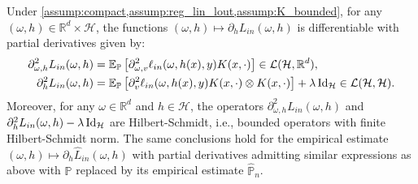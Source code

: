\begin{proposition}\label{prop:fre_diff_L_v}
	Under \cref{assump:compact,assump:reg_lin_lout,assump:K_bounded}, for any $(\omega,h)\in{\mathbb{R}^d}\times \mathcal{H}$, the functions $(\omega,h)\mapsto \partial_{h} L_{in}(\omega,h)$ is differentiable with partial derivatives given by: 
\begin{align*}
    \partial_{\omega, h}^2 L_{in}(\omega, h)&=\mathbb{E}_{\mathbb{P}}\left[\partial_{\omega, v}^2\ell_{in}(\omega, h(x), y)K(x,\cdot)\right]\in\mathcal{L}(\mathcal{H},\mathbb{R}^d),\\
  \partial_h^2 L_{in}(\omega, h)&=\mathbb{E}_{\mathbb{P}}\left[\partial_v^2 \ell_{in}(\omega, h(x), y)K(x,\cdot)\otimes K(x,\cdot)\right] + \lambda\operatorname{Id}_\mathcal{H}\in\mathcal{L}(\mathcal{H},\mathcal{H}).\label{eq:partial2_h_Lin}
\end{align*}
Moreover, {for any $\omega\in\mathbb{R}^d$ and $h\in\mathcal{H}$,} the operators $ \partial_{\omega, h}^2 L_{in}(\omega, h)$ and $ \partial_{h}^2 L_{in}(\omega, h)-\lambda \operatorname{Id}_{\mathcal{H}}$ are Hilbert-Schmidt, i.e., bounded operators with finite Hilbert-Schmidt norm. The same conclusions hold for the empirical estimate $(\omega,h)\mapsto \partial_{h}\widehat{L}_{in}(\omega,h)$ with partial derivatives admitting similar expressions as above with $\mathbb{P}$ replaced by its empirical estimate $\hat{\mathbb{P}}_n$.
\end{proposition}

